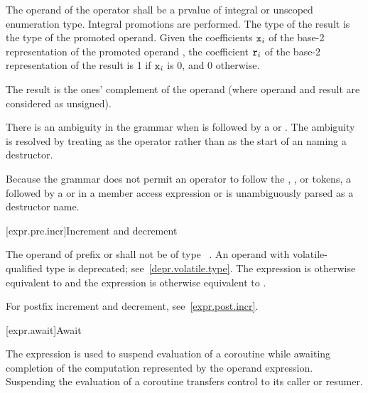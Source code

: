 \pnum
{}%
The operand of the \tcode{\~{}} operator shall be a prvalue of
integral or unscoped enumeration type.
Integral promotions are performed.
The type of the result is the type of the promoted operand.
Given the coefficients $\texttt{\protect x}_i$
of the base-2 representation
of the promoted operand ,
the coefficient $\texttt{\protect r}_i$
of the base-2 representation of the result 
is 1 if $\texttt{\protect x}_i$ is 0, and 0 otherwise.
\begin{note}
The result is the ones' complement of the operand
(where operand and result are considered as unsigned).
\end{note}
There is an ambiguity
in the grammar when \tcode{\~{}} is followed by
a  or .
The ambiguity is resolved by treating \tcode{\~{}} as the
operator rather than as the start of an 
naming a destructor.
\begin{note}
Because the grammar does not permit an operator to follow the
, \tcode{->}, or \tcode{::} tokens, a \tcode{\~{}} followed by
a  or  in a
member access expression or  is
unambiguously parsed as a destructor name.
\end{note}

[expr.pre.incr]{Increment and decrement}

\pnum
{}%
%
%
%
%
%
The operand of prefix \tcode{++} or \tcode{--}
shall not be of type \cv{}~.
An operand with volatile-qualified type is deprecated;
see~\ref{depr.volatile.type}.
The expression  is otherwise equivalent to  and
the expression  is otherwise equivalent to .
\begin{note}
For postfix increment and decrement, see~\ref{expr.post.incr}.
\end{note}

[expr.await]{Await}
%
%

\pnum
The  expression is used to suspend evaluation of a
coroutine while awaiting completion of
the computation represented by the operand expression.
Suspending the evaluation of a coroutine
transfers control to its caller or resumer.

